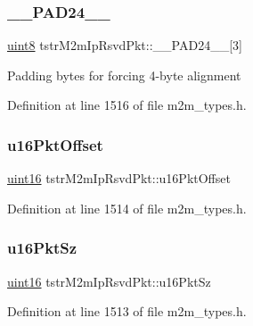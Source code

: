\subsubsection{\texorpdfstring{\+\_\+\+\_\+\+P\+A\+D24\+\_\+\+\_\+}{\_\_PAD24\_\_}}
{\footnotesize\ttfamily \hyperlink{group__DataT_ga4df709a77647e870bbf1d955b8edc9a6}{uint8} tstr\+M2m\+Ip\+Rsvd\+Pkt\+::\+\_\+\+\_\+\+P\+A\+D24\+\_\+\+\_\+\mbox{[}3\mbox{]}}

Padding bytes for forcing 4-\/byte alignment 

Definition at line 1516 of file m2m\+\_\+types.\+h.

\mbox{\label{structtstrM2mIpRsvdPkt_af7ca067246d6e1072f2f083197cefa63}} 
\subsubsection{\texorpdfstring{u16\+Pkt\+Offset}{u16PktOffset}}
{\footnotesize\ttfamily \hyperlink{group__DataT_ga1daa745171fc6e31d942c161422a76f9}{uint16} tstr\+M2m\+Ip\+Rsvd\+Pkt\+::u16\+Pkt\+Offset}



Definition at line 1514 of file m2m\+\_\+types.\+h.

\mbox{\label{structtstrM2mIpRsvdPkt_a382bb08e219a5310706cabb5c73042a6}} 
\subsubsection{\texorpdfstring{u16\+Pkt\+Sz}{u16PktSz}}
{\footnotesize\ttfamily \hyperlink{group__DataT_ga1daa745171fc6e31d942c161422a76f9}{uint16} tstr\+M2m\+Ip\+Rsvd\+Pkt\+::u16\+Pkt\+Sz}



Definition at line 1513 of file m2m\+\_\+types.\+h.

\mbox{\label{structtstrM2mIpRsvdPkt_a99e019aded6ee09bd86bb1d0bfdebead}} 
